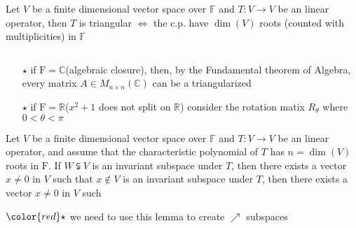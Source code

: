 \begin{thm*}[Schur]
	Let $V$ be a finite dimensional vector space over $\mathbb F$ and $T:V \rightarrow V$ be an linear operator, then $T$ is triangular $\Leftrightarrow$ the c.p. have $\dim(V)$ roots (counted with multiplicities) in $\mathbb F$
\end{thm*}

\begin{rmk*} $ $
	\begin{enumerate}
		\item[$\star$] if $\mathrm F = \mathbb C$(algebraic closure), then, by the Fundamental theorem of Algebra, every matrix $A \in M_{n \times n}(\mathbb C)$ can be a triangularized
		\item[$\star$] if $\mathrm F = \mathbb R$($x^2 + 1$ does not split on $\mathbb R$) consider the rotation matix $R_{\theta}$ where $0<\theta < \pi$
	\end{enumerate}
\end{rmk*}

\begin{lmma*}
	Let $V$ be a finite dimensional vector space over $\mathbb F$ and $T:V \rightarrow V$ be an linear operator, and assume that the characteristic polynomial of $T$ has $n = \dim(V)$ roots in $\mathrm F$. If $W \subsetneqq V$ is an invariant subspace under $T$, then there exists a vector $x \neq 0$ in $V$ such that $x \notin V$ is an invariant subspace under $T$, then there exists a vector $x \neq 0$ in $V$ such 

\end{lmma*}

$\color{red}\star $ we need to use this lemma to create $\nearrow$ subspaces

\newpage

